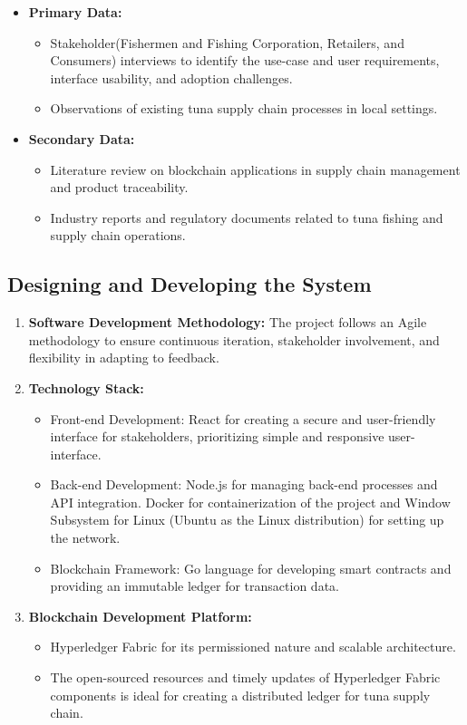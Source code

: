 \begin{itemize}
	\item \textbf{Primary Data:} 
	\begin{itemize}
		\item Stakeholder(Fishermen and Fishing Corporation, Retailers, and Consumers) interviews to identify the use-case and user requirements, interface usability, and adoption challenges.
		\item Observations of existing tuna supply chain processes in local settings.
	\end{itemize}
	\item \textbf{Secondary Data:} 
	\begin{itemize}
		\item Literature review on blockchain applications in supply chain management and product traceability.
		\item Industry reports and regulatory documents related to tuna fishing and supply chain operations.
	\end{itemize}
\end{itemize}

\subsection{Designing and Developing the System}

\begin{enumerate}
	\item \textbf{Software Development Methodology:} The project follows an Agile methodology to ensure continuous iteration, stakeholder involvement, and flexibility in adapting to feedback.
	\item \textbf{Technology Stack:} 
		\begin{itemize}
			\item Front-end Development: React for creating a secure and user-friendly interface for stakeholders, prioritizing simple and responsive user-interface.
			\item Back-end Development: Node.js for managing back-end processes and API integration. Docker for containerization of the project and Window Subsystem for Linux (Ubuntu as the Linux distribution) for setting up the network.
			\item Blockchain Framework: Go language for developing smart contracts and providing an immutable ledger for transaction data.
		\end{itemize}
	\item \textbf{Blockchain Development Platform:} 
		\begin{itemize}
			\item Hyperledger Fabric for its permissioned nature and scalable architecture.
			\item The open-sourced resources and timely updates of Hyperledger Fabric components is ideal for creating a distributed ledger for tuna supply chain.
		\end{itemize}
\end{enumerate}

